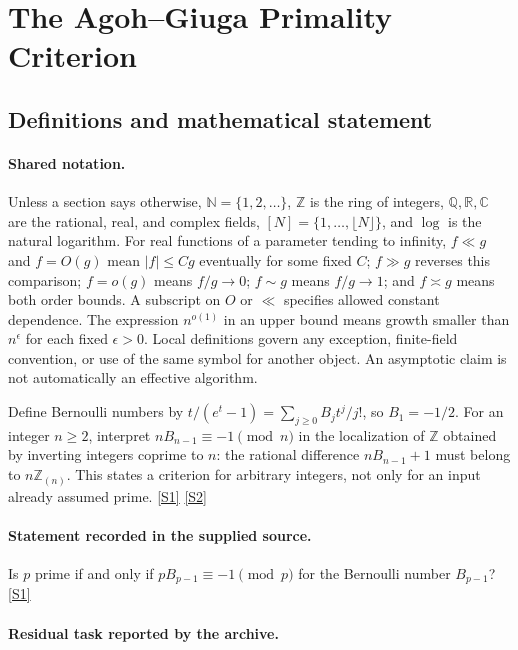 \documentclass[11pt,a4paper]{article}
\newcommand{\N}{\mathbb{N}}
\newcommand{\Z}{\mathbb{Z}}
\newcommand{\Q}{\mathbb{Q}}
\newcommand{\R}{\mathbb{R}}
\newcommand{\C}{\mathbb{C}}
\newcommand{\sref}[2]{\hyperlink{source:#1:#2}{[S#2]}}
\begin{document}
\section{The Agoh--Giuga Primality Criterion}\label{statement}


\subsection{Definitions and mathematical statement}

\paragraph{Shared notation.}Unless a section says otherwise, $\N=\{1,2,\ldots\}$,
$\Z$ is the ring of integers, $\Q,\R,\C$ are the rational, real, and complex
fields, $[N]=\{1,\ldots,\lfloor N\rfloor\}$, and $\log$ is the natural
logarithm. For real functions of a parameter tending to infinity,
$f\ll g$ and $f=O(g)$ mean $|f|\leq Cg$ eventually for some fixed $C$;
$f\gg g$ reverses this comparison; $f=o(g)$ means $f/g\to0$;
$f\sim g$ means $f/g\to1$; and $f\asymp g$ means both order bounds.
A subscript on $O$ or $\ll$ specifies allowed constant dependence.
The expression $n^{o(1)}$ in an upper bound means growth smaller than
$n^\epsilon$ for each fixed $\epsilon>0$. Local definitions govern any
exception, finite-field convention, or use of the same symbol for another
object. An asymptotic claim is not automatically an effective algorithm.



Define Bernoulli numbers by $t/(e^t-1)=\sum_{j\geq0}B_jt^j/j!$, so $B_1=-1/2$. For an integer $n\geq2$, interpret $nB_{n-1}\equiv-1\pmod n$ in the localization of $\Z$ obtained by inverting integers coprime to $n$: the rational difference $nB_{n-1}+1$ must belong to $n\Z_{(n)}$. This states a criterion for arbitrary integers, not only for an input already assumed prime. \sref{statement}{1} \sref{statement}{2}

\paragraph{Statement recorded in the supplied source.}
Is $p$ prime if and only if $pB_{p-1} \equiv -1 \pmod{p}$ for the Bernoulli number $B_{p-1}$? \sref{statement}{1}

\paragraph{Residual task reported by the archive.}
\end{document}
